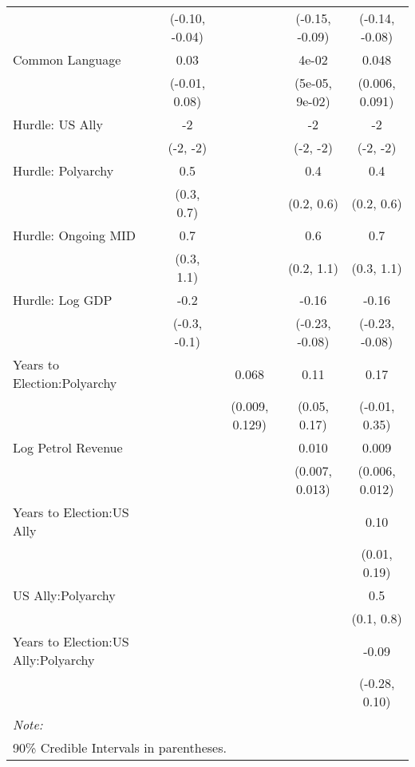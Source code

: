 \begin{table}[H]
{\begin{tabular}[t]{lcccc}
 & (-0.10, -0.04) &  & (-0.15, -0.09) & (-0.14, -0.08)\\
Common Language & 0.03 &  & 4e-02 & 0.048\\
 & (-0.01, 0.08) &  & (5e-05, 9e-02) & (0.006, 0.091)\\
Hurdle: US Ally & -2 &  & -2 & -2\\
 & (-2, -2) &  & (-2, -2) & (-2, -2)\\
Hurdle: Polyarchy & 0.5 &  & 0.4 & 0.4\\
 & (0.3, 0.7) &  & (0.2, 0.6) & (0.2, 0.6)\\
Hurdle: Ongoing MID & 0.7 &  & 0.6 & 0.7\\
 & (0.3, 1.1) &  & (0.2, 1.1) & (0.3, 1.1)\\
Hurdle: Log GDP & -0.2 &  & -0.16 & -0.16\\
 & (-0.3, -0.1) &  & (-0.23, -0.08) & (-0.23, -0.08)\\
Years to Election:Polyarchy &  & 0.068 & 0.11 & 0.17\\
 &  & (0.009, 0.129) & (0.05, 0.17) & (-0.01, 0.35)\\
Log Petrol Revenue &  &  & 0.010 & 0.009\\
 &  &  & (0.007, 0.013) & (0.006, 0.012)\\
Years to Election:US Ally &  &  &  & 0.10\\
 &  &  &  & (0.01, 0.19)\\
US Ally:Polyarchy &  &  &  & 0.5\\
 &  &  &  & (0.1, 0.8)\\
Years to Election:US Ally:Polyarchy &  &  &  & -0.09\\
 &  &  &  & (-0.28, 0.10)\\
\bottomrule
\multicolumn{5}{l}{\rule{0pt}{1em}\textit{Note: }}\\
\multicolumn{5}{l}{\rule{0pt}{1em}90\% Credible Intervals in parentheses.}\\
\end{tabular}}
\end{table}
